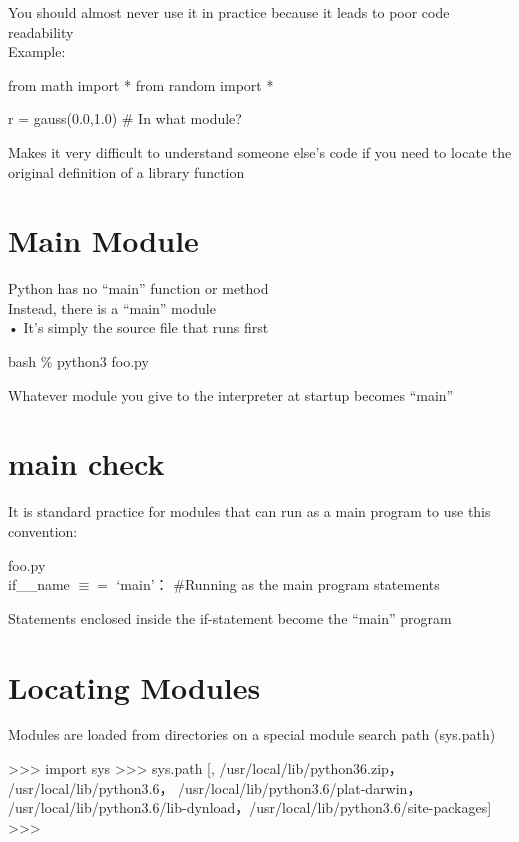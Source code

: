 \documentclass[
  letterpaper,
  DIV=11,
  numbers=noendperiod]{scrreprt}
\newenvironment{Shaded}{\begin{snugshade}}{\end{snugshade}}
\newcommand{\NormalTok}[1]{\textcolor[rgb]{0.00,0.23,0.31}{#1}}
\begin{document}
You should almost never use it in practice because it leads to poor code
readability\\
Example:

from math import * from random import *

r = gauss(0.0,1.0) \# In what module?

Makes it very difficult to understand someone else's code if you need to
locate the original definition of a library function


\chapter{Main Module}\label{main-module}

Python has no ``main'' function or method\\
Instead, there is a ``main'' module\\
• It's simply the source file that runs first

bash \% python3 foo.py

Whatever module you give to the interpreter at startup becomes ``main''


\chapter{main check}\label{main-check}

It is standard practice for modules that can run as a main program to
use this convention:

foo.py\\
if\_\_name \(\equiv =\) `main'： \#Running as the main program
statements

Statements enclosed inside the if-statement become the ``main'' program


\chapter{Locating Modules}\label{locating-modules}

Modules are loaded from directories on a special module search path
(sys.path)

\begin{Shaded}
\begin{Highlighting}[]
\NormalTok{\textgreater{}\textgreater{}\textgreater{} import sys   }
\NormalTok{\textgreater{}\textgreater{}\textgreater{} sys.path   }
\NormalTok{[\textquotesingle{}\textquotesingle{}, \textquotesingle{}/usr/local/lib/python36.zip\textquotesingle{}， \textquotesingle{}/usr/local/lib/python3.6\textquotesingle{}， \textquotesingle{}/usr/local/lib/python3.6/plat{-}darwin\textquotesingle{}， \textquotesingle{}/usr/local/lib/python3.6/lib{-}dynload\textquotesingle{}，\textquotesingle{}/usr/local/lib/python3.6/site{-}packages\textquotesingle{}]   }
\NormalTok{\textgreater{}\textgreater{}\textgreater{}}
\end{Highlighting}
\end{Shaded}
\end{document}
